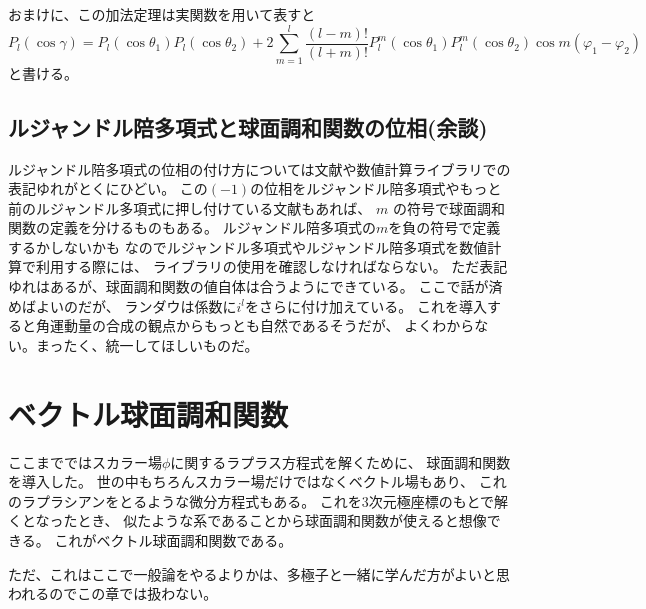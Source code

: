 \documentclass[../../master.tex]{subfiles}
\begin{document}
おまけに、この加法定理は実関数を用いて表すと
\begin{equation}
	P_l(\cos\gamma) = P_l(\cos\theta_1)P_l(\cos\theta_2)
	+ 2\sum_{m=1}^{l}\frac{(l-m)!}{(l+m)!}P_l^m(\cos\theta_1)P_l^m(\cos\theta_2)\cos m(\varphi_1-\varphi_2)
\end{equation}
と書ける。

\subsection{ルジャンドル陪多項式と球面調和関数の位相(余談)}

ルジャンドル陪多項式の位相の付け方については文献や数値計算ライブラリでの表記ゆれがとくにひどい。
この\((-1)\)の位相をルジャンドル陪多項式やもっと前のルジャンドル多項式に押し付けている文献もあれば、
\(m\) の符号で球面調和関数の定義を分けるものもある。
ルジャンドル陪多項式の\(m\)を負の符号で定義するかしないかも
なのでルジャンドル多項式やルジャンドル陪多項式を数値計算で利用する際には、
ライブラリの使用を確認しなければならない。
ただ表記ゆれはあるが、球面調和関数の値自体は合うようにできている。
ここで話が済めばよいのだが、
ランダウは係数に\(i^l\)をさらに付け加えている。
これを導入すると角運動量の合成の観点からもっとも自然であるそうだが、
よくわからない。まったく、統一してほしいものだ。

\section{ベクトル球面調和関数}
ここまでではスカラー場\(\phi\)に関するラプラス方程式を解くために、
球面調和関数を導入した。
世の中もちろんスカラー場だけではなくベクトル場もあり、
これのラプラシアンをとるような微分方程式もある。
これを3次元極座標のもとで解くとなったとき、
似たような系であることから球面調和関数が使えると想像できる。
これがベクトル球面調和関数である。

ただ、これはここで一般論をやるよりかは、多極子と一緒に学んだ方がよいと思われるのでこの章では扱わない。
\end{document}
